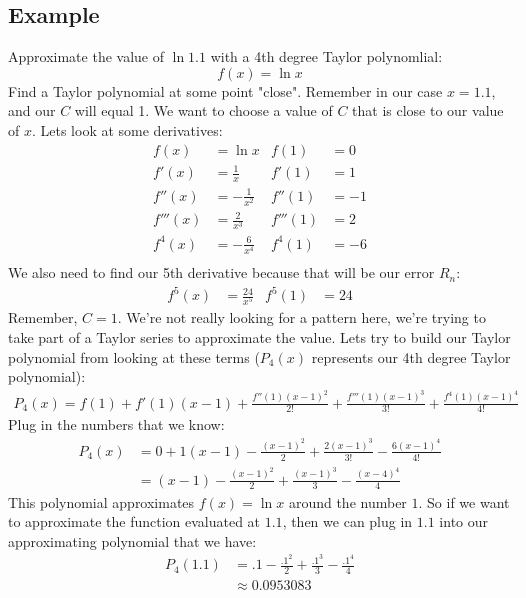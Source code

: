 \documentclass{report}
\begin{document}
    \subsection{Example}
        Approximate the value of \(\ln 1.1\) with a 4th degree Taylor polynomlial:
        \[f(x) = \ln x\]
        Find a Taylor polynomial at some point "close".
        Remember in our case \(x = 1.1\), and our \(C\) will equal 1.
        We want to choose a value of \(C\) that is close to our value of \(x\).
        Lets look at some derivatives:
        \begin{align*}
            f(x) &= \ln x 
            &f(1) &= 0 \\
            f'(x) &= \frac{1}{x}
            &f'(1) &= 1 \\
            f''(x) &= - \frac{1}{x^2}
            &f''(1) &= -1 \\
            f'''(x) &= \frac{2}{x^3}
            &f'''(1) &= 2 \\
            f^4(x) &= - \frac{6}{x^4}
            &f^4(1) &= -6 \\
        \end{align*}
        We also need to find our 5th derivative because that will be our error \(R_n\):
        \begin{align*}
            f^5(x) &= \frac{24}{x^5}
            &f^5(1) &= 24
        \end{align*}
        Remember, \(C = 1\).
        We're not really looking for a pattern here, we're trying to take part of a Taylor series to approximate the value.
        Lets try to build our Taylor polynomial from looking at these terms (\(P_4(x)\) represents our 4th degree Taylor polynomial):
        \begin{align*}
            P_4(x) = f(1) + f'(1)(x-1) + \frac{f''(1)(x-1)^2}{2!} + \frac{f'''(1)(x-1)^3}{3!} + \frac{f^4(1)(x-1)^4}{4!}
        \end{align*}
        Plug in the numbers that we know:
        \begin{align*}
            P_4(x) &= 0 + 1(x-1) - \frac{(x-1)^2}{2} + \frac{2(x-1)^3}{3!} - \frac{6(x-1)^4}{4!} \\
            &= (x-1) - \frac{(x-1)^2}{2} + \frac{(x-1)^3}{3} -\frac{(x-4)^4}{4}
        \end{align*}
        This polynomial approximates \(f(x) = \ln x\) around the number \(1\).
        So if we want to approximate the function evaluated at \(1.1\), then we can plug in \(1.1\) into our approximating polynomial that we have:
        \begin{align*}
            P_4(1.1) &= .1 - \frac{.1^2}{2} + \frac{.1^3}{3} - \frac{.1^4}{4} \\
            &\approx 0.0953083
        \end{align*}
\end{document}
